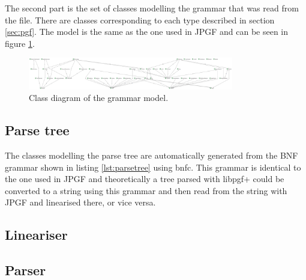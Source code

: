 The second part is the set of classes modelling the grammar that was read from the file. There are classes corresponding to each type described in section \ref{sec:pgf}. The model is the same as the one used in JPGF and can be seen in figure \ref{fig:grammarmodel}.

\begin{figure}[htb]
\centering
\includegraphics[width=0.8\textwidth]{fig/grammarmodel}
\caption{Class diagram of the grammar model.}
\label{fig:grammarmodel}
\end{figure}


\subsection{Parse tree}
The classes modelling the parse tree are automatically generated from the BNF grammar shown in listing \ref{lst:parsetree} using bnfc. This grammar is identical to the one used in JPGF and theoretically a tree parsed with libpgf+ could be converted to a string using this grammar and then read from the string with JPGF and linearised there, or vice versa.



\subsection{Lineariser}
\subsection{Parser}
